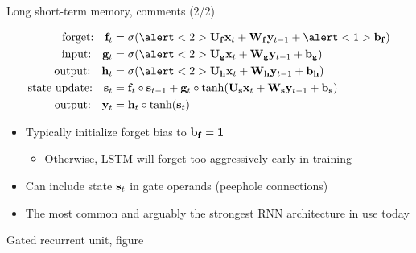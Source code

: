 \begin{frame}[t]{Long short-term memory, comments (2/2)}
    \begin{block}{}
        \vspace{-5mm}
        \begin{align*}
            \text{forget:} \quad \f_t &= \sigma(\alert<2>{\U_\f \x_t + \W_\f \y_{t-1} + \alert<1>{\b_\f}}) \\
            \text{input:} \quad \g_t &= \sigma(\alert<2>{\U_\g \x_t + \W_\g \y_{t-1} + \b_\g}) \\
            \text{output:} \quad \h_t &= \sigma(\alert<2>{\U_\h \x_t + \W_\h \y_{t-1} + \b_\h}) \\
            \text{state update:} \quad \s_t &= \f_t \circ \s_{t-1} + \g_t \circ \tanh(\U_\s \x_t + \W_\s \y_{t-1} + \b_\s) \\
            \text{output:} \quad \y_t &= \h_t \circ \tanh(\s_t)
        \end{align*}
    \end{block}

    \begin{itemize}
        \item<+-> Typically initialize forget bias to $\mathbf{b}_{\mathbf{f}} = \mathbf{1}$~\citep{GersNC00,JozefowiczICML15}
        \begin{itemize}
            \item Otherwise, LSTM will forget too aggressively early in training
        \end{itemize}
        \item<+-> Can include state $\mathbf{s}_t$ in gate operands (peephole connections)
        \item<+-> The most common and arguably the strongest RNN architecture in use today \citep{JozefowiczICML15}
    \end{itemize}
\end{frame}

\begin{frame}{Gated recurrent unit, figure}
    \centering
    
\end{frame}

